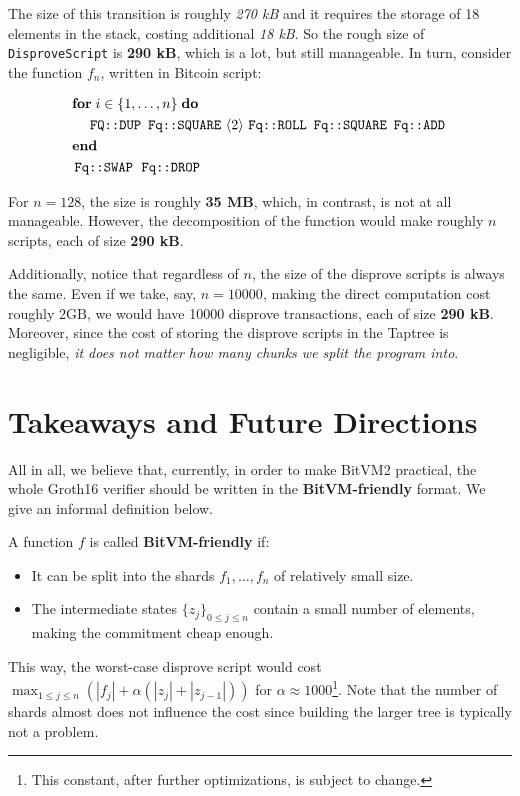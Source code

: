 \documentclass{iacrtrans}
\newcommand{\elem}[1]{\, \langle #1 \rangle \,}
\newcommand{\opcode}[1]{\, \texttt{#1} \,}
\begin{document}
The size of this transition is roughly \textit{270 kB} and it requires the storage of 18 elements in the stack, costing additional \textit{18 kB}. So the rough size of \texttt{DisproveScript} is \textbf{290 kB}, which is a lot, but still manageable. In turn, consider the function $f_n$, written in Bitcoin script:
\begin{empheqboxed}
  \begin{align*}
    &\textbf{for} \; i \in \{1,\dots,n\} \; \textbf{do} \\
    & \;\;\;\; \opcode{\texttt{FQ::DUP}} \, \opcode{\texttt{Fq::SQUARE}} \elem{2} \opcode{\texttt{Fq::ROLL}} \, \opcode{\texttt{Fq::SQUARE}} \, \opcode{\texttt{Fq::ADD}} \\
    & \textbf{end} \\
    & \opcode{\texttt{Fq::SWAP}} \; \opcode{\texttt{Fq::DROP}}
  \end{align*}
\end{empheqboxed}

For $n=128$, the size is roughly \textbf{35 MB}, which, in contrast, is not at all manageable. However, the decomposition of the function would make roughly $n$ scripts, each of size \textbf{290 kB}. 

Additionally, notice that regardless of $n$, the size of the disprove scripts is always the same. Even if we take, say, $n=10000$, making the direct computation cost roughly $2\text{GB}$, we would have 10000 disprove transactions, each of size \textbf{290 kB}. Moreover, since the cost of storing the disprove scripts in the Taptree is negligible, \emph{it does not matter how many chunks we split the program into}.

\section{Takeaways and Future Directions}

All in all, we believe that, currently, in order to make BitVM2 practical, the whole Groth16 verifier should be written in the \textbf{BitVM-friendly} format. We give an informal definition below.

\begin{definition}
  A function $f$ is called \textbf{BitVM-friendly} if:
  \begin{itemize}
    \item It can be split into the shards $f_1,\dots,f_n$ of relatively small size.
    \item The intermediate states $\{z_j\}_{0 \leq j \leq n}$ contain a small number of elements, making the commitment cheap enough.
  \end{itemize}

  This way, the worst-case disprove script would cost $\max_{1 \leq j \leq n}\left(|f_j| + \alpha(|z_j| + |z_{j-1}|)\right)$ for $\alpha \approx 1000$\footnote{This constant, after further optimizations, is subject to change.}. Note that the number of shards almost does not influence the cost since building the larger tree is typically not a problem.
\end{definition}
\end{document}
